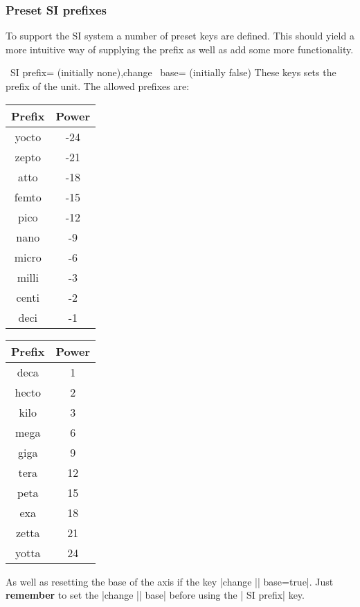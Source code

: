 \subsubsection{Preset SI prefixes}
\label{sec:SI:prefix}
To support the SI system a number of preset keys are defined. This should yield a more intuitive way of supplying the prefix as well as add some more
functionality. 
\begin{pgfplotsxykeylist}{\x\ SI prefix= (initially none),change \x\
      base= (initially false)}
  These keys sets the prefix of the unit. The allowed prefixes are:
  
  \begin{center}
    \begin{tabular}{>{\ttfamily}cc}
      \toprule
      \rm Prefix & Power\\
      \midrule
      yocto & -24\\
      zepto & -21\\
      atto & -18\\
      femto & -15\\
      pico & -12\\
      nano& -9\\
      micro & -6\\
      milli & -3\\
      centi& -2\\
      deci& -1\\
      \bottomrule
    \end{tabular}\qquad\qquad
    \begin{tabular}{>{\ttfamily}cc}
      \toprule
      \rm Prefix & Power\\
      \midrule
      deca & 1\\
      hecto & 2\\
      kilo & 3\\
      mega & 6\\
      giga & 9\\
      tera& 12\\
      peta & 15\\
      exa & 18\\
      zetta& 21\\
      yotta& 24\\
      \bottomrule
    \end{tabular}
  \end{center}
  
  As well as resetting the base of the axis if the key |change || base=true|. Just \textbf{remember} to
  set the |change |\meta{axis}| base| before using the \meta{axis}| SI prefix| key. 


\end{pgfplotsxykeylist}
